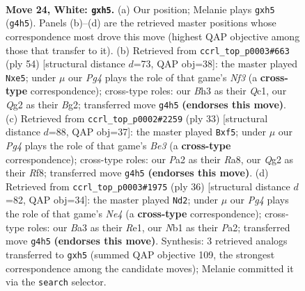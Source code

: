 \documentclass[11pt]{article}
\begin{document}
\clearpage

\begin{figure}[p]\centering
\begin{subfigure}{0.46\textwidth}\centering
\resizebox{\linewidth}{!}{%
\newchessgame
\chessboard[
  setfen={r3r1k1/bp1b1pp1/pq2p1n1/7p/3p2P1/BP5B/P2P1PQP/RN2RK2 w - - 0 24},
  showmover=false,
  pgfstyle=straightmove, color=movearrow, markmove={g4-h5}
]}
\caption{}
\end{subfigure}\hfill
\begin{subfigure}{0.46\textwidth}\centering
\resizebox{\linewidth}{!}{%
\newchessgame
\chessboard[
  setfen={r3rbk1/4qpp1/2p4p/p1Ppn3/4b3/BP2PNP1/5PBP/R1QR2K1 w - - 0 28},
  showmover=false,
  pgfstyle=straightmove, color=movearrow, markmove={f3-e5}
]}
\caption{}
\end{subfigure}
\\[4pt]
\begin{subfigure}{0.46\textwidth}\centering
\resizebox{\linewidth}{!}{%
\newchessgame
\chessboard[
  setfen={r4rk1/pp1q2pp/2n1b3/2p2P2/4NP1b/PPpP3P/2P3B1/R1BQ1RK1 b - - 0 17},
  showmover=false,
  pgfstyle=straightmove, color=movearrow, markmove={e6-f5}
]}
\caption{}
\end{subfigure}\hfill
\begin{subfigure}{0.46\textwidth}\centering
\resizebox{\linewidth}{!}{%
\newchessgame
\chessboard[
  setfen={3rr1k1/p2nb1pp/bp4q1/2pP1p2/4N3/1P4P1/PB3PBP/2RQR1K1 w - - 0 19},
  showmover=false,
  pgfstyle=straightmove, color=movearrow, markmove={e4-d2}
]}
\caption{}
\end{subfigure}
\caption{\textbf{Move 24, White: \texttt{gxh5}.} (a) Our position; Melanie plays \texttt{gxh5} (\texttt{g4h5}). Panels (b)--(d) are the retrieved master positions whose correspondence most drove this move (highest QAP objective among those that transfer to it). (b) Retrieved from \texttt{ccrl\_top\_p0003\#663} (ply 54) [structural distance $d$=73, QAP obj=38]: the master played \texttt{Nxe5}; under $\mu$ our \emph{Pg4} plays the role of that game's \emph{Nf3} (a \textbf{cross-type} correspondence); cross-type roles: our \emph{B}h3 as their \emph{Q}c1, our \emph{Q}g2 as their \emph{B}g2; transferred move \texttt{g4h5} \textbf{(endorses this move)}. (c) Retrieved from \texttt{ccrl\_top\_p0002\#2259} (ply 33) [structural distance $d$=88, QAP obj=37]: the master played \texttt{Bxf5}; under $\mu$ our \emph{Pg4} plays the role of that game's \emph{Be3} (a \textbf{cross-type} correspondence); cross-type roles: our \emph{P}a2 as their \emph{R}a8, our \emph{Q}g2 as their \emph{R}f8; transferred move \texttt{g4h5} \textbf{(endorses this move)}. (d) Retrieved from \texttt{ccrl\_top\_p0003\#1975} (ply 36) [structural distance $d$=82, QAP obj=34]: the master played \texttt{Nd2}; under $\mu$ our \emph{Pg4} plays the role of that game's \emph{Ne4} (a \textbf{cross-type} correspondence); cross-type roles: our \emph{B}a3 as their \emph{R}e1, our \emph{N}b1 as their \emph{P}a2; transferred move \texttt{g4h5} \textbf{(endorses this move)}. Synthesis: 3 retrieved analogs transferred to \texttt{gxh5} (summed QAP objective 109, the strongest correspondence among the candidate moves); Melanie committed it via the \texttt{search} selector.}
\label{fig:thought-m46}
\end{figure}
\end{document}
